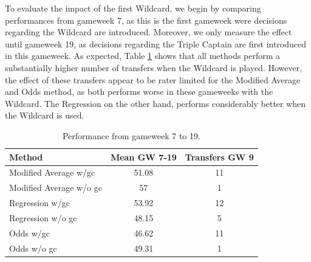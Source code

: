 \begin{table}[H]
\centering
{}
\caption{Results including gamechips.}
\label{tab:res_incl_gamechips}
\end{table}


To evaluate the impact of the first Wildcard,  we begin by comparing performances from gameweek 7, as this is the first gameweek were decisions regarding the Wildcard are introduced. Moreover, we only measure the effect until gameweek 19, as decisions regarding the Triple Captain are first introduced in this gameweek. As expected, Table \ref{tab:first_wildcard} shows that all methods perform a substantially higher number of transfers when the Wildcard is played. However, the effect of these transfers appear to be rater limited for the Modified Average and Odds method, as both performs worse in these gameweeks with the Wildcard. The Regression on the other hand, performs considerably better when the Wildcard is used.  

\newpar




\begin{table}[H]
\centering
\begin{tabular}{@{}lcc@{}}
\toprule
                Method  & Mean GW 7-19  & Transfers GW 9 \\ \midrule
Modified Average w/gc   & 51.08 & 11             \\
Modified Average w/o gc & 57    & 1              \\
Regression w/gc         & 53.92 & 12             \\
Regression w/o gc       & 48.15 & 5              \\
Odds w/gc               & 46.62 & 11             \\
Odds w/o gc             & 49.31 & 1              \\ \bottomrule
\end{tabular}
\caption{Performance from gameweek 7 to 19.}
\label{tab:first_wildcard}
\end{table}



